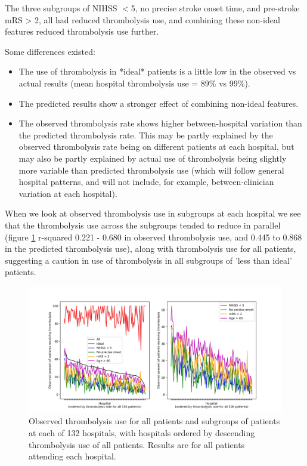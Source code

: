 The three subgroups of NIHSS $<$5, no precise stroke onset time, and pre-stroke mRS > 2, all had reduced thrombolysis use, and combining these non-ideal features reduced thrombolysis use further.

Some differences existed:

\begin{itemize}
    \item The use of thrombolysis in *ideal* patients is a little low in the observed vs actual results (mean hospital thrombolysis use = 89\% vs 99\%).
    \item The predicted results show a stronger effect of combining non-ideal features.
    \item The observed thrombolysis rate shows higher between-hospital variation than the predicted thrombolysis rate. This may be partly explained by the observed thrombolysis rate being on different patients at each hospital, but may also be partly explained by actual use of thrombolysis being slightly more variable than predicted thrombolysis use (which will follow general hospital patterns, and will not include, for example, between-clinician variation at each hospital).
\end{itemize}

When we look at observed thrombolysis use in subgroups at each hospital we see that the thrombolysis use across the subgroups tended to reduce in parallel (figure \ref{fig:subgroup_rate_1} r-squared 0.221 - 0.680 in observed thrombolysis use, and 0.445 to 0.868 in the predicted thrombolysis use), along with thrombolysis use for all patients, suggesting a  caution in use of thrombolysis in all subgroups of 'less than ideal' patients. 

\begin{figure}
\centering
\includegraphics[width=1\textwidth]{./images/15a_actual_subgroup}
\caption{Observed thrombolysis use for all patients and subgroups of patients at each of 132 hospitals, with hospitals ordered by descending thrombolysis use of all patients. Results are for all patients attending each hospital.}
\label{fig:subgroup_rate_1}
\end{figure}

